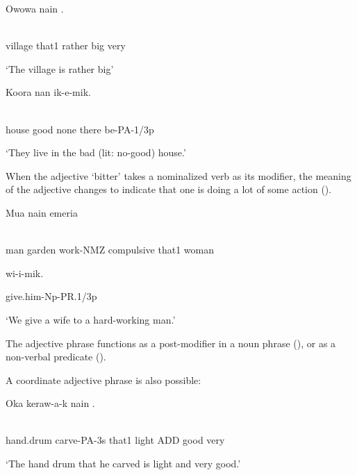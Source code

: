 \ea%
\label{ex:x841}
\gll Owowa  nain  . \\
      \\
\glt
\z

village  that1  rather  big  very

`The village is rather big'

\ea%
\label{ex:x842}
\gll Koora    nan  ik-e-mik. \\
      \\
\glt
\z

house  good  none  there  be-PA-1/3p

`They live in the bad (lit: no-good) house.'

When the adjective   `bitter' takes a nominalized verb as its modifier, the meaning of the adjective changes to indicate that one is doing a lot of some action ().

\ea%
\label{ex:x840}
\gll Mua    nain  emeria  \\
      \\
\glt
\z

man  garden  work-NMZ  compulsive  that1  woman  

wi-i-mik.

give.him-Np-PR.1/3p

`We give a wife to a hard-working man.'

The adjective phrase functions as a post-modifier in a noun phrase (), or as a non-verbal predicate (). 

A coordinate adjective phrase is also possible:

\ea%
\label{ex:x891}
\gll Oka  keraw-a-k  nain  . \\
      \\
\glt
\z

hand.drum  carve-PA-3s  that1  light  ADD  good  very  

`The hand drum that he carved is light and very good.'

